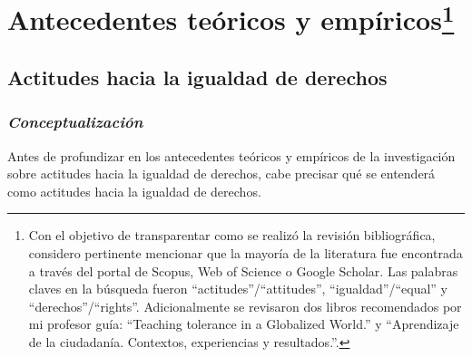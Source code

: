 \documentclass[12pt,twoside]{templates/facsothesis}
\begin{document}
\hypertarget{antecedentes-teuxf3ricos-y-empuxedricos1}{%
\chapter[Antecedentes teóricos y empíricos]{\texorpdfstring{Antecedentes teóricos y empíricos\footnote{Con el objetivo de transparentar como se realizó la revisión bibliográfica, considero pertinente mencionar que la mayoría de la literatura fue encontrada a través del portal de Scopus, Web of Science o Google Scholar. Las palabras claves en la búsqueda fueron ``actitudes''/``attitudes'', ``igualdad''/``equal'' y ``derechos''/``rights''. Adicionalmente se revisaron dos libros recomendados por mi profesor guía: ``Teaching tolerance in a Globalized World.'' y ``Aprendizaje de la ciudadanía. Contextos, experiencias y resultados.''.}}{Antecedentes teóricos y empíricos}}\label{antecedentes-teuxf3ricos-y-empuxedricos1}}

\hypertarget{actitudes-hacia-la-igualdad-de-derechos}{%
\section{Actitudes hacia la igualdad de derechos}\label{actitudes-hacia-la-igualdad-de-derechos}}

\hypertarget{conceptualizaciuxf3n}{%
\subsection{\texorpdfstring{\emph{Conceptualización}}{Conceptualización}}\label{conceptualizaciuxf3n}}

Antes de profundizar en los antecedentes teóricos y empíricos de la investigación sobre actitudes hacia la igualdad de derechos, cabe precisar qué se entenderá como actitudes hacia la igualdad de derechos.
\end{document}
